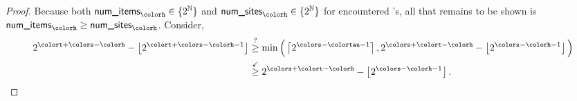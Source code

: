 \begin{proof}
Because both $\textsf{num\_items}_{\colorh} \in \{2^{\mathbb{N}}\}$ and $\textsf{num\_sites}_{\colorh} \in \{2^{\mathbb{N}}\}$ for encountered \hv{}'s, all that remains to be shown is $\textsf{num\_items}_{\colorh} \geq \textsf{num\_sites}_{\colorh}$.
Consider,
\begin{align*}
2^{\colort + \colors - \colorh} - \left\lfloor2^{\colort + \colors - \colorh - 1} \right\rfloor
&\stackrel{?}{\geq}
\min\Big(
\left\lceil 2^{\colors - \colortau - 1} \right\rceil,
2^{\colors + \colort - \colorh} - \left\lfloor 2^{\colors - \colorh - 1} \right\rfloor
\Big)\\
&\stackrel{\checkmark}{\geq}
2^{\colors + \colort - \colorh} - \left\lfloor 2^{\colors - \colorh - 1} \right\rfloor.
\end{align*}
\end{proof}
